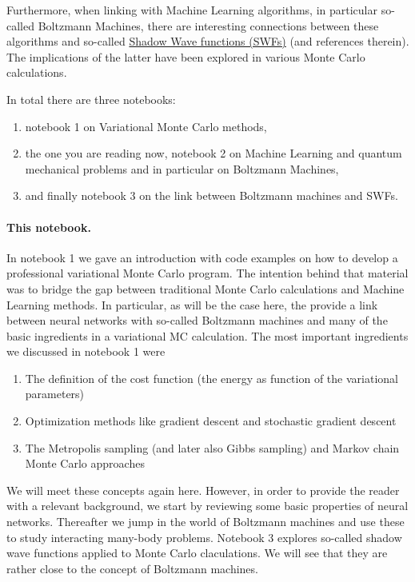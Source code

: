 \documentclass[%
oneside,                 %
final,                   %
10pt]{article}
\begin{document}
Furthermore, when linking with Machine Learning algorithms, in particular
so-called Boltzmann Machines, there are interesting connections between
these algorithms and so-called \href{{https://journals.aps.org/pre/abstract/10.1103/PhysRevE.90.053304}}{Shadow Wave functions (SWFs)} (and references therein). The implications of the latter have been explored in various Monte Carlo calculations. 

In total there are three notebooks:
\begin{enumerate}
\item notebook 1 on Variational Monte Carlo methods, 

\item the one you are reading now, notebook 2 on Machine Learning and quantum mechanical problems and in particular on Boltzmann Machines, 

\item and finally notebook 3 on the link between Boltzmann machines and SWFs. 
\end{enumerate}

\noindent
\paragraph{This notebook.}
In notebook 1 we gave an introduction with code examples on how to
develop a professional variational Monte Carlo program. The intention
behind that material was to bridge the gap between traditional Monte
Carlo calculations and Machine Learning methods. In particular, as
will be the case here, the provide a link between neural networks with
so-called Boltzmann machines and many of the basic ingredients in a
variational MC calculation.  The most important ingredients we
discussed in notebook 1 were

\begin{enumerate}
\item The definition of the cost function (the energy as function of the variational parameters)

\item Optimization methods like gradient descent and stochastic gradient descent

\item The Metropolis sampling (and later also Gibbs sampling) and Markov chain Monte Carlo approaches
\end{enumerate}

\noindent
We will meet these concepts again here. However, in order to provide
the reader with a relevant background, we start by reviewing some
basic properties of neural networks. Thereafter we jump in the world
of Boltzmann machines and use these to study interacting many-body
problems. Notebook 3 explores so-called shadow wave functions applied
to Monte Carlo claculations. We will see that they are rather close to
the concept of Boltzmann machines.
\end{document}
